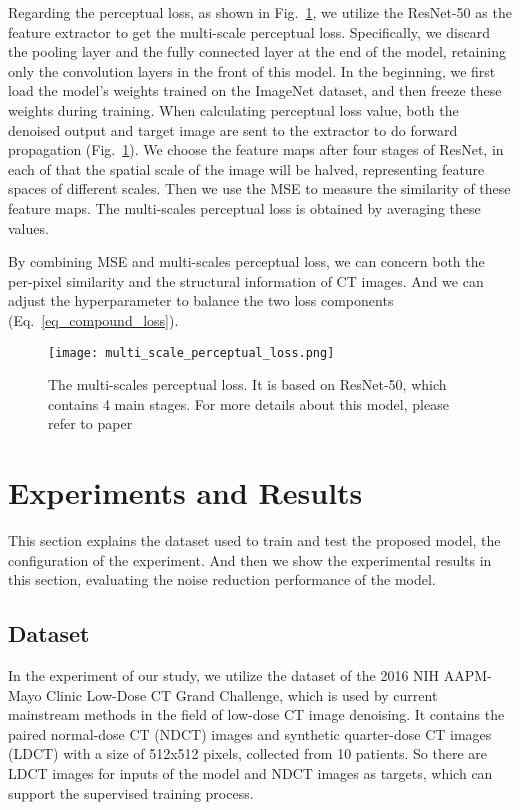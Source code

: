 \documentclass[conference]{IEEEtran}
\begin{document}
                Regarding the perceptual loss, as shown in Fig.~\ref{multi_scale_perceptual_loss}, we utilize the ResNet-50\cite{He_2016_CVPR} as the feature extractor to get the multi-scale perceptual loss.
                Specifically, we discard the pooling layer and the fully connected layer at the end of the model, retaining only the convolution layers in the front of this model.
                In the beginning, we first load the model's weights trained on the ImageNet dataset\cite{5206848}, and then freeze these weights during training.
                When calculating perceptual loss value, both the denoised output and target image are sent to the extractor to do forward propagation (Fig.~\ref{multi_scale_perceptual_loss}).
                We choose the feature maps after four stages of ResNet, in each of that the spatial scale of the image will be halved, representing feature spaces of different scales.
                Then we use the MSE to measure the similarity of these feature maps.
                The multi-scales perceptual loss is obtained by averaging these values.

                By combining MSE and multi-scales perceptual loss, we can concern both the per-pixel similarity and the structural information of CT images.
                And we can adjust the hyperparameter  to balance the two loss components (Eq.~\ref{eq_compound_loss}).

                \begin{figure}[t]
                    \texttt{[image: multi\_scale\_perceptual\_loss.png]}
                    \caption{The multi-scales perceptual loss. It is based on ResNet-50, which contains 4 main stages. For more details about this model, please refer to paper \cite{He_2016_CVPR}}
                    \label{multi_scale_perceptual_loss}
                \end{figure}

    \section{Experiments and Results}
        This section explains the dataset used to train and test the proposed model, the configuration of the experiment. 
        And then we show the experimental results in this section, evaluating the noise reduction performance of the model.

        \subsection{Dataset}
            In the experiment of our study, we utilize the dataset of the 2016 NIH AAPM-Mayo Clinic Low-Dose CT Grand Challenge\cite{mccollough_low-dose_2017}, which is used by current mainstream methods in the field of low-dose CT image denoising.
            It contains the paired normal-dose CT (NDCT) images and synthetic quarter-dose CT images (LDCT) with a size of 512x512 pixels, collected from 10 patients.
            So there are LDCT images for inputs of the model and NDCT images as targets, which can support the supervised training process.
\end{document}
